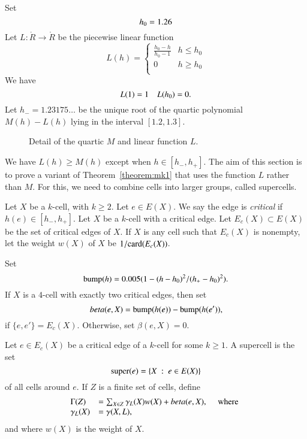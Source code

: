 \begin{definition}
Set
$$
  h_0 = 1.26\\  %
$$
Let $L:\ring{R}\to\ring{R}$ be the piecewise linear function 
$$
L(h) = \begin{cases}
\frac{h_0-h}{h_0-1} & h \le h_0 \\
0 & h\ge h_0 \\
\end{cases}
$$
We have
$$
L(1) = 1\quad L(\hm) = 0.
$$
Let $h_- = 1.23175\ldots$ be the unique root of the quartic polynomial
$M(h)-L(h)$ lying in the interval $[1.2,1.3]$.
\end{definition}

\begin{figure}[htb]
  \centering
  \caption{Detail of the quartic $M$ and linear function $L$.}
  \label{fig:L}
\end{figure}

We have $L(h)\ge M(h)$ except when $h\in [h_-,h_+]$.  The aim of this section is to prove a variant of Theorem~\ref{theorem:mk1} that uses the function $L$ rather than $M$.  For this, we need to combine cells into larger groups, called supercells.

\begin{definition}
Let $X$ be a $k$-cell, with $k\ge 2$.  Let $e\in E(X)$.
We say the edge is {\it critical} if $h(e)\in[h_-,h_+]$.
Let $X$ be a $k$-cell with a critical edge.  Let $E_c(X)\subset E(X)$
be the set of critical edges of $X$.  If $X$ is any cell such that
$E_c(X)$ is nonempty, let the weight $w(X)$ of $X$  
be $1/\op{card}(E_c(X))$.
\end{definition}

\begin{definition}[$\beta$]  Set 
$$
\op{bump}(h) = 0.005 (1 - (h-h_0)^2/(h_+-h_0)^2).
$$
If $X$ is a $4$-cell with exactly two critical edges, then set
$$
\beta(e,X) = \op{bump}(h(e)) - \op{bump}(h(e')),
$$
if $\{e,e'\} = E_c(X)$.  Otherwise, set $\beta(e,X) = 0$.
\end{definition}

\begin{definition}
Let $e\in E_c(X)$ be a critical edge of a $k$-cell for some $k\ge 1$.
A supercell is the set 
$$
\op{super}(e) = \{X\mid e\in E(X)\} 
$$
of all cells around $e$. 
If $Z$ is a finite set of cells, define
$$
\begin{array}{lll}
\Gamma(Z) &= \sum_{X\in Z} \gamma_L(X) w(X) +\beta(e,X),\quad\hbox{ where }\\
\gamma_L(X) &= \gamma(X,L),
\end{array}
$$
and where $w(X)$ is the weight of $X$.

\end{definition}

